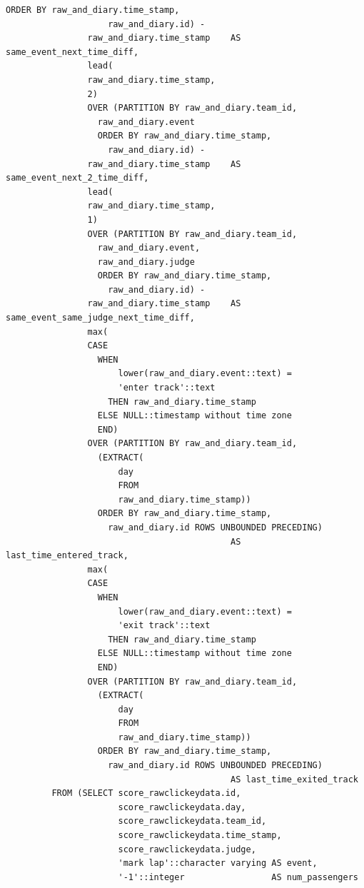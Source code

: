 \documentclass[11pt]{article}
\begin{document}
\begin{lstlisting}[style=sql, caption={Full Audit query}, label={lst:sql_audit_query}]
                  ORDER BY raw_and_diary.time_stamp,
                    raw_and_diary.id) -
                raw_and_diary.time_stamp    AS same_event_next_time_diff,
                lead(
                raw_and_diary.time_stamp,
                2)
                OVER (PARTITION BY raw_and_diary.team_id,
                  raw_and_diary.event
                  ORDER BY raw_and_diary.time_stamp,
                    raw_and_diary.id) -
                raw_and_diary.time_stamp    AS same_event_next_2_time_diff,
                lead(
                raw_and_diary.time_stamp,
                1)
                OVER (PARTITION BY raw_and_diary.team_id,
                  raw_and_diary.event,
                  raw_and_diary.judge
                  ORDER BY raw_and_diary.time_stamp,
                    raw_and_diary.id) -
                raw_and_diary.time_stamp    AS same_event_same_judge_next_time_diff,
                max(
                CASE
                  WHEN
                      lower(raw_and_diary.event::text) =
                      'enter track'::text
                    THEN raw_and_diary.time_stamp
                  ELSE NULL::timestamp without time zone
                  END)
                OVER (PARTITION BY raw_and_diary.team_id,
                  (EXTRACT(
                      day
                      FROM
                      raw_and_diary.time_stamp))
                  ORDER BY raw_and_diary.time_stamp,
                    raw_and_diary.id ROWS UNBOUNDED PRECEDING)
                                            AS last_time_entered_track,
                max(
                CASE
                  WHEN
                      lower(raw_and_diary.event::text) =
                      'exit track'::text
                    THEN raw_and_diary.time_stamp
                  ELSE NULL::timestamp without time zone
                  END)
                OVER (PARTITION BY raw_and_diary.team_id,
                  (EXTRACT(
                      day
                      FROM
                      raw_and_diary.time_stamp))
                  ORDER BY raw_and_diary.time_stamp,
                    raw_and_diary.id ROWS UNBOUNDED PRECEDING)
                                            AS last_time_exited_track
         FROM (SELECT score_rawclickeydata.id,
                      score_rawclickeydata.day,
                      score_rawclickeydata.team_id,
                      score_rawclickeydata.time_stamp,
                      score_rawclickeydata.judge,
                      'mark lap'::character varying AS event,
                      '-1'::integer                 AS num_passengers

\end{lstlisting}
\end{document}

